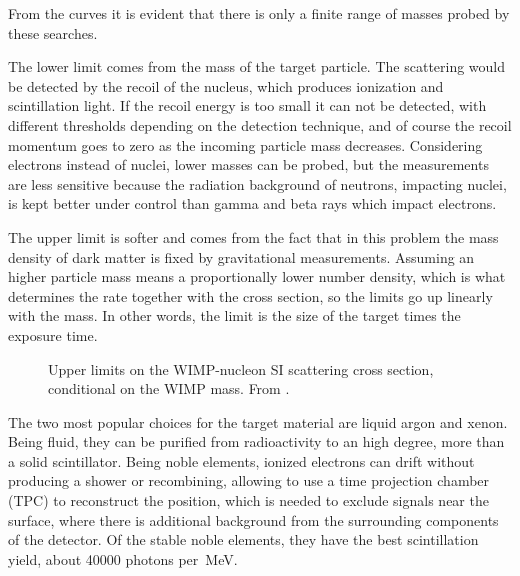 
From the curves it is evident that there is only a finite range of masses
probed by these searches.

The lower limit comes from the mass of the target particle. The scattering
would be detected by the recoil of the nucleus, which produces ionization and
scintillation light. If the recoil energy is too small it can not be detected,
with different thresholds depending on the detection technique, and of course
the recoil momentum goes to zero as the incoming particle mass decreases.
Considering electrons instead of nuclei, lower masses can be probed, but the
measurements are less sensitive because the radiation background of neutrons,
impacting nuclei, is kept better under control than gamma and beta rays which
impact electrons.

The upper limit is softer and comes from the fact that in this problem the mass
density of dark matter is fixed by gravitational measurements. Assuming an
higher particle mass means a proportionally lower number density, which is what
determines the rate together with the cross section, so the limits go up
linearly with the mass. In other words, the limit is the size of the target
times the exposure time.


\begin{figure}
    
    
    \caption{\label{fig:sigmalimits} Upper limits on the WIMP-nucleon SI
    scattering cross section, conditional on the WIMP mass. From
    \cite[fig.~27.1 p.~481]{zyla2020}.}
    
\end{figure}

The two most popular choices for the target material are liquid argon and
xenon. Being fluid, they can be purified from radioactivity to an high degree,
more than a solid scintillator. Being noble elements, ionized electrons can
drift without producing a shower or recombining, allowing to use a time
projection chamber (TPC) to reconstruct the position, which is needed to
exclude signals near the surface, where there is additional background from the
surrounding components of the detector. Of the stable noble elements, they have
the best scintillation yield, about \num{40000} photons per~\si{MeV}.


